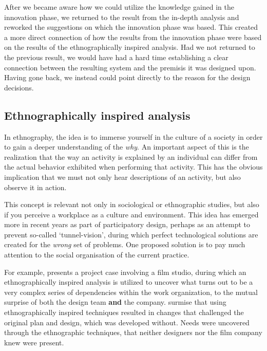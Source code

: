 After we became aware how we could utilize the knowledge gained in the innovation 
phase, we returned to the result from the in-depth analysis and reworked the 
suggestions on which the innovation phase was based. This created a more direct
connection of how the results from the innovation phase were based on the 
results of the ethnographically inspired analysis. Had we not returned to the previous
result, we would have had a hard time establishing a clear connection between the 
resulting system and the premisis it was designed upon. Having gone back, we instead 
could point directly to the reason for the design decisions.

\subsection{Ethnographically inspired analysis}
In ethnography, the idea is to immerse yourself in the culture of a
society in order to gain a deeper understanding of the \textit{why}. An
important aspect of this is the realization that the way an activity is explained by an
individual can differ from the actual behavior exhibited when performing that
activity. This has the obvious implication that we must not only hear
descriptions of an activity, but also observe it in action\cite{simonsen1997using}.

This concept is relevant not only in sociological or ethnographic studies, but also if
you perceive a workplace as a culture and environment. This idea has emerged more in recent
years as part of participatory design\cite{crabtree1998ethnography}, perhaps as an attempt to
prevent so-called `tunnel-vision', during which perfect technological solutions are created for
the \textit{wrong} set of problems\cite{sol1984prototyping}. One proposed solution is to pay much
attention to the social organisation of the current 
practice\cite{hughes1994moving, crabtree1998ethnography, simonsen1997using, bodker2004participatory}.

For example, \cite{simonsen1997using} presents a project case involving a film
studio, during which an ethnographically inspired analysis is utilized to
uncover what turns out to be a very complex series of dependencies within the
work organization, to the mutual surprise of both the design team \textbf{and}
the company. \cite{simonsen1997using} surmise that using ethnographically inspired techniques
resulted in changes that challenged the original plan and design, which was developed without.
Needs were uncovered through the ethnographic techniques, that neither designers nor
the film company knew were present.

